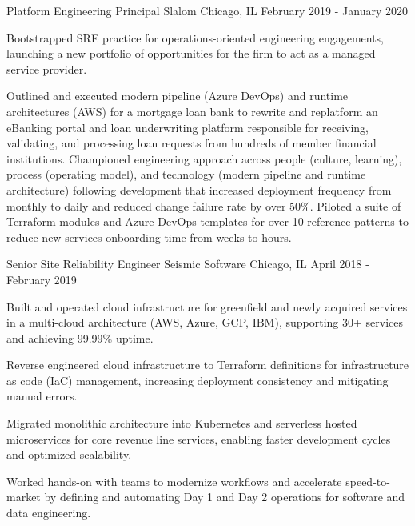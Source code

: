 \begin{cventries}
  \cventry
    {Platform Engineering Principal} %
    {Slalom} %
    {Chicago, IL} %
    {February 2019 - January 2020} %
    {
      \begin{cvitems} %
        \item {Bootstrapped SRE practice for operations-oriented engineering engagements, launching a new portfolio of opportunities for the firm to act as a managed service provider.}
        \item {Outlined and executed modern pipeline (Azure DevOps) and runtime architectures (AWS) for a mortgage loan bank to rewrite and replatform an eBanking portal and loan underwriting platform responsible for receiving, validating, and processing loan requests from hundreds of member financial institutions. Championed engineering approach across people (culture, learning), process (operating model), and technology (modern pipeline and runtime architecture) following development that increased deployment frequency from monthly to daily and reduced change failure rate by over 50\%. Piloted a suite of Terraform modules and Azure DevOps templates for over 10 reference patterns to reduce new services onboarding time from weeks to hours.}
      \end{cvitems}
    }

  \cventry
    {Senior Site Reliability Engineer} %
    {Seismic Software} %
    {Chicago, IL} %
    {April 2018 - February 2019} %
    {
      \begin{cvitems} %
        \item {Built and operated cloud infrastructure for greenfield and newly acquired services in a multi-cloud architecture (AWS, Azure, GCP, IBM), supporting 30+ services and achieving 99.99\% uptime.}
        \item {Reverse engineered cloud infrastructure to Terraform definitions for infrastructure as code (IaC) management, increasing deployment consistency and mitigating manual errors.}
        \item {Migrated monolithic architecture into Kubernetes and serverless hosted microservices for core revenue line services, enabling faster development cycles and optimized scalability.}
        \item {Worked hands-on with teams to modernize workflows and accelerate speed-to-market by defining and automating Day 1 and Day 2 operations for software and data engineering.}
      \end{cvitems}
    }


\end{cventries}
